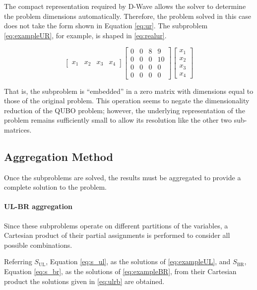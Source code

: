 The compact representation required by D-Wave allows the solver to determine the problem dimensions automatically. 
Therefore, the problem solved in this case does not take the form shown in Equation \eqref{eq:ur}.
The subproblem \eqref{eq:exampleUR}, for example, is shaped in \eqref{eq:realur}.

\begin{equation}
    \begin{bmatrix}
        x_1 & x_2 & x_3 & x_4
    \end{bmatrix}
    \begin{bmatrix}
        0 & 0 & 8 & 9 \\
        0 & 0 & 0 & 10 \\
        0 & 0 & 0 & 0 \\
        0 & 0 & 0 & 0 
    \end{bmatrix}
    \begin{bmatrix}
        x_1 \\
        x_2 \\
        x_3 \\
        x_4 
    \end{bmatrix}
    \label{eq:realur}
\end{equation}

That is, the subproblem is ``embedded'' in a zero matrix with dimensions equal to those of the original problem. 
This operation seems to negate the dimensionality reduction of the QUBO problem; however, the underlying representation of the problem remains sufficiently small to allow its resolution like the other two sub-matrices.

\subsection{Aggregation Method}\label{sec:aggr}

Once the subproblems are solved, the results must be aggregated to provide a complete solution to the problem.

\paragraph{UL-BR aggregation} Since these subproblems operate on different partitions of the variables, a Cartesian product of their partial assignments is performed to consider all possible combinations. 

Referring $S_{\operatorname{UL}}$, Equation \eqref{eq:s_ul}, as the solutions of \eqref{eq:exampleUL}, and $S_{\operatorname{BR}}$, Equation \eqref{eq:s_br}, as the solutions of \eqref{eq:exampleBR}, from their Cartesian product the solutions given in \eqref{eq:ulrb} are obtained.

